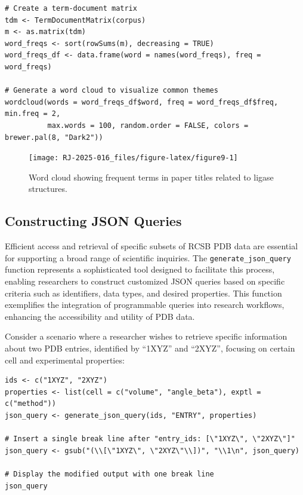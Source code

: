 \begin{verbatim}
# Create a term-document matrix
tdm <- TermDocumentMatrix(corpus)
m <- as.matrix(tdm)
word_freqs <- sort(rowSums(m), decreasing = TRUE)
word_freqs_df <- data.frame(word = names(word_freqs), freq = word_freqs)

# Generate a word cloud to visualize common themes
wordcloud(words = word_freqs_df$word, freq = word_freqs_df$freq, min.freq = 2,
          max.words = 100, random.order = FALSE, colors = brewer.pal(8, "Dark2"))
\end{verbatim}

\begin{figure}[H]
\texttt{[image: RJ-2025-016\_files/figure-latex/figure9-1]} \caption{Word cloud showing frequent terms in paper titles related to ligase structures.}\label{fig:figure9}
\end{figure}

\subsection{Constructing JSON Queries}\label{constructing-json-queries}

Efficient access and retrieval of specific subsets of RCSB PDB data are essential for supporting a broad range of scientific inquiries. The \texttt{generate\_json\_query} function represents a sophisticated tool designed to facilitate this process, enabling researchers to construct customized JSON queries based on specific criteria such as identifiers, data types, and desired properties. This function exemplifies the integration of programmable queries into research workflows, enhancing the accessibility and utility of PDB data.

Consider a scenario where a researcher wishes to retrieve specific information about two PDB entries, identified by ``1XYZ'' and ``2XYZ'', focusing on certain cell and experimental properties:

\begin{verbatim}
ids <- c("1XYZ", "2XYZ")
properties <- list(cell = c("volume", "angle_beta"), exptl = c("method"))
json_query <- generate_json_query(ids, "ENTRY", properties)

# Insert a single break line after "entry_ids: [\"1XYZ\", \"2XYZ\"]"
json_query <- gsub("(\\[\"1XYZ\", \"2XYZ\"\\])", "\\1\n", json_query)

# Display the modified output with one break line
json_query
\end{verbatim}


